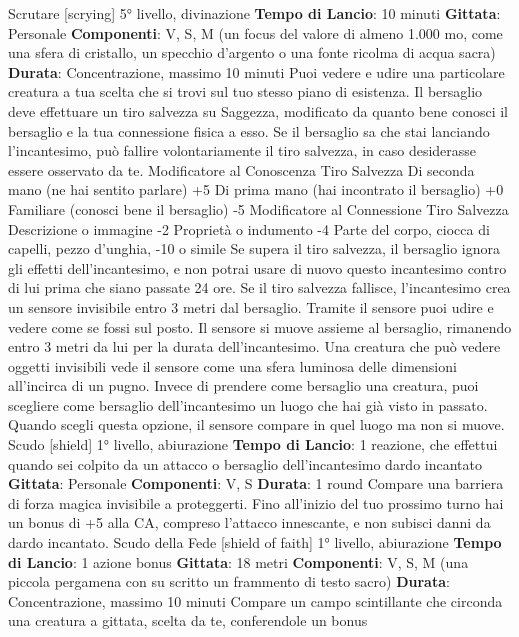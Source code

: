 \begin{multicols}{2}
Scrutare
[scrying]
5° livello, divinazione
\textbf{Tempo di Lancio}: 10 minuti
\textbf{Gittata}: Personale
\textbf{Componenti}: V, S, M (un focus del valore di almeno
1.000 mo, come una sfera di cristallo, un specchio
d’argento o una fonte ricolma di acqua sacra)
\textbf{Durata}: Concentrazione, massimo 10 minuti
Puoi vedere e udire una particolare creatura a tua
scelta che si trovi sul tuo stesso piano di esistenza. Il
bersaglio deve effettuare un tiro salvezza su Saggezza,
modificato da quanto bene conosci il bersaglio e la tua
connessione fisica a esso. Se il bersaglio sa che stai
lanciando l’incantesimo, può fallire volontariamente il
tiro salvezza, in caso desiderasse essere osservato da
te.
Modificatore al
Conoscenza Tiro Salvezza
Di seconda mano (ne hai sentito parlare) +5
Di prima mano (hai incontrato il bersaglio) +0
Familiare (conosci bene il bersaglio) -5
Modificatore al
Connessione Tiro Salvezza
Descrizione o immagine -2
Proprietà o indumento -4
Parte del corpo, ciocca di capelli, pezzo d’unghia, -10
o simile
Se supera il tiro salvezza, il bersaglio ignora gli effetti
dell’incantesimo, e non potrai usare di nuovo questo
incantesimo contro di lui prima che siano passate 24
ore.
Se il tiro salvezza fallisce, l’incantesimo crea un
sensore invisibile entro 3 metri dal bersaglio. Tramite il
sensore puoi udire e vedere come se fossi sul posto. Il
sensore si muove assieme al bersaglio, rimanendo
entro 3 metri da lui per la durata dell’incantesimo. Una
creatura che può vedere oggetti invisibili vede il 
sensore come una sfera luminosa delle dimensioni
all’incirca di un pugno.
Invece di prendere come bersaglio una creatura, puoi
scegliere come bersaglio dell’incantesimo un luogo che
hai già visto in passato. Quando scegli questa opzione,
il sensore compare in quel luogo ma non si muove.
Scudo
[shield]
1° livello, abiurazione
\textbf{Tempo di Lancio}: 1 reazione, che effettui quando sei
colpito da un attacco o bersaglio dell’incantesimo dardo
incantato
\textbf{Gittata}: Personale
\textbf{Componenti}: V, S
\textbf{Durata}: 1 round
Compare una barriera di forza magica invisibile a
proteggerti. Fino all’inizio del tuo prossimo turno hai un
bonus di +5 alla CA, compreso l’attacco innescante, e
non subisci danni da dardo incantato.
Scudo della Fede
[shield of faith]
1° livello, abiurazione
\textbf{Tempo di Lancio}: 1 azione bonus
\textbf{Gittata}: 18 metri
\textbf{Componenti}: V, S, M (una piccola pergamena con su
scritto un frammento di testo sacro)
\textbf{Durata}: Concentrazione, massimo 10 minuti
Compare un campo scintillante che circonda una
creatura a gittata, scelta da te, conferendole un bonus

\end{multicols}
